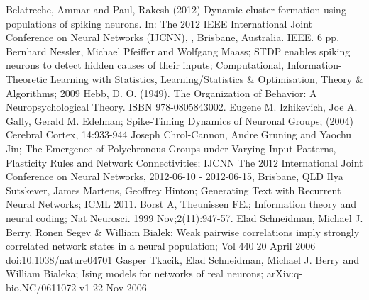 \documentclass[a4paper,10pt]{article}
\begin{document}
\begin{thebibliography}{9}
Belatreche, Ammar and Paul, Rakesh (2012) Dynamic cluster formation using populations of spiking neurons. In: The 2012 IEEE International Joint Conference on Neural Networks (IJCNN), , Brisbane, Australia. IEEE. 6 pp.
Bernhard Nessler, Michael Pfeiffer and Wolfgang Maass; STDP enables spiking neurons to detect hidden causes of their inputs; Computational, Information-Theoretic Learning with Statistics, Learning/Statistics \& Optimisation, Theory \& Algorithms; 2009
Hebb, D. O. (1949). The Organization of Behavior: A Neuropsychological Theory. ISBN 978-0805843002.
Eugene M. Izhikevich, Joe A. Gally, Gerald M. Edelman; Spike-Timing Dynamics of Neuronal Groups; (2004) Cerebral Cortex, 14:933-944
Joseph Chrol-Cannon, Andre Gruning and Yaochu Jin; The Emergence of Polychronous Groups under Varying Input Patterns, Plasticity Rules and Network Connectivities; IJCNN The 2012 International Joint Conference on Neural Networks, 2012-06-10 - 2012-06-15, Brisbane, QLD
Ilya Sutskever, James Martens, Geoffrey Hinton; Generating Text with Recurrent Neural Networks; ICML 2011. 
Borst A, Theunissen FE.; Information theory and neural coding; Nat Neurosci. 1999 Nov;2(11):947-57.
Elad Schneidman, Michael J. Berry, Ronen Segev \& William Bialek; Weak pairwise correlations imply strongly correlated network states in a neural population; Vol 440|20 April 2006 doi:10.1038/nature04701
Gasper Tkacik, Elad Schneidman, Michael J. Berry and William Bialeka; Ising models for networks of real neurons; arXiv:q-bio.NC/0611072 v1 22 Nov 2006


\end{thebibliography}
\end{document}
